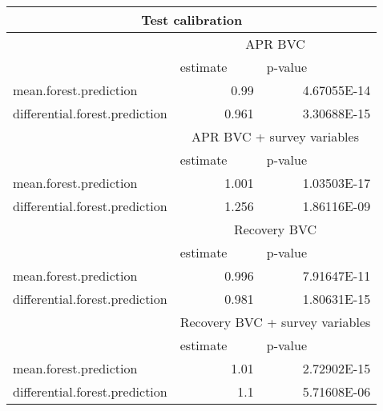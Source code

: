 \begin{tabular}{lrr}
\multicolumn{3}{c}{Test calibration} \\
\midrule
      & \multicolumn{2}{c}{APR BVC} \\
\midrule
\midrule
      & \multicolumn{1}{l}{estimate} & \multicolumn{1}{l}{p-value} \\
\cmidrule{2-3}mean.forest.prediction & 0.99  & 4.67055E-14 \\
differential.forest.prediction & 0.961 & 3.30688E-15 \\
\midrule
      & \multicolumn{2}{c}{APR BVC + survey variables} \\
\midrule
\midrule
      & \multicolumn{1}{l}{estimate} & \multicolumn{1}{l}{p-value} \\
\cmidrule{2-3}mean.forest.prediction & 1.001 & 1.03503E-17 \\
differential.forest.prediction & 1.256 & 1.86116E-09 \\
\midrule
      & \multicolumn{2}{c}{Recovery BVC} \\
\midrule
\midrule
      & \multicolumn{1}{l}{estimate} & \multicolumn{1}{l}{p-value} \\
\cmidrule{2-3}mean.forest.prediction & 0.996 & 7.91647E-11 \\
differential.forest.prediction & 0.981 & 1.80631E-15 \\
\midrule
      & \multicolumn{2}{c}{Recovery BVC + survey variables} \\
\midrule
\midrule
      & \multicolumn{1}{l}{estimate} & \multicolumn{1}{l}{p-value} \\
\cmidrule{2-3}mean.forest.prediction & 1.01  & 2.72902E-15 \\
differential.forest.prediction & 1.1   & 5.71608E-06 \\
\bottomrule
\bottomrule
\end{tabular}%
